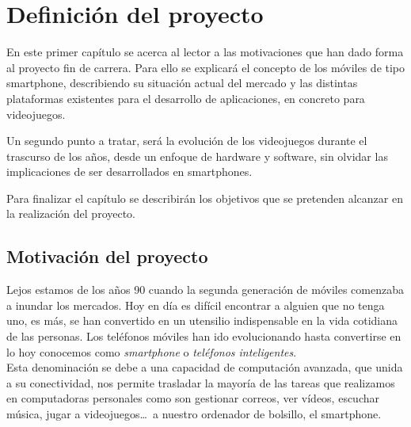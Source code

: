\pagestyle{fancy}
\chapter{Definición del proyecto}
En este primer capítulo se acerca al lector a las motivaciones que han dado forma al proyecto fin de carrera. Para ello se explicará el concepto de los móviles de tipo smartphone, describiendo su situación actual del mercado y las distintas plataformas existentes para el desarrollo de aplicaciones, en concreto para videojuegos.
\newline

Un segundo punto a tratar, será la evolución de los videojuegos durante el trascurso de los años, desde un enfoque de hardware y software, sin olvidar las implicaciones de ser desarrollados en smartphones.
\newline

Para finalizar el capítulo se describirán los objetivos que se pretenden alcanzar en la realización del proyecto.
\newpage

\section{Motivación del proyecto}

Lejos estamos de los años 90 cuando la segunda generación de móviles comenzaba a inundar los mercados. Hoy en día es difícil encontrar a alguien que no tenga uno, es más, se han convertido en un utensilio indispensable en la vida cotidiana de las personas. Los teléfonos móviles han ido evolucionando hasta convertirse en lo hoy conocemos como \emph{smartphone} o \emph{teléfonos inteligentes}. 
\\

Esta denominación se debe a una capacidad de computación avanzada, que unida a su conectividad, nos permite trasladar la mayoría de las tareas que realizamos en computadoras personales como son gestionar correos, ver vídeos, escuchar música, jugar a videojuegos\ldots\ a nuestro ordenador de bolsillo, el smartphone.
\newline

